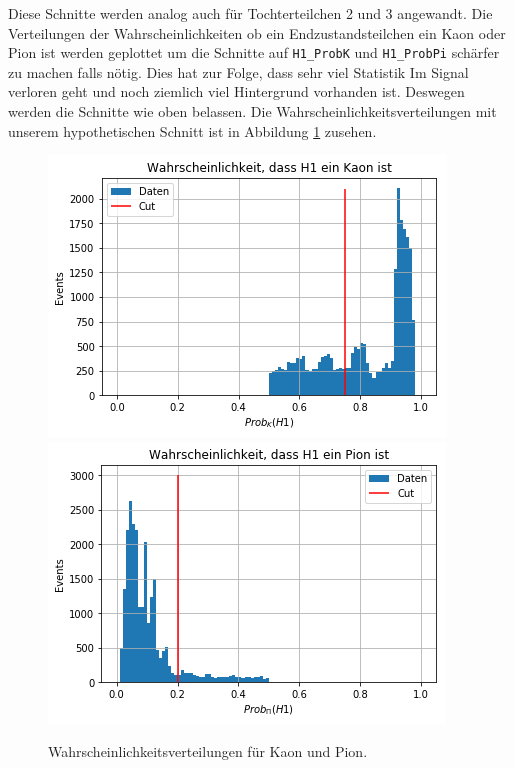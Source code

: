 Diese Schnitte werden analog auch f\"ur Tochterteilchen 2 und 3 angewandt.
Die Verteilungen der Wahrscheinlichkeiten ob ein Endzustandsteilchen ein Kaon oder Pion ist werden geplottet um die Schnitte auf \texttt{H1\_ProbK} und \texttt{H1\_ProbPi} sch\"arfer zu machen falls nötig.
Dies hat zur Folge, dass sehr viel Statistik Im Signal verloren geht und noch ziemlich viel Hintergrund vorhanden ist. Deswegen werden die Schnitte wie oben belassen.
Die Wahrscheinlichkeitsverteilungen mit unserem hypothetischen Schnitt ist in Abbildung \ref{fig:probCuts} zusehen.

\begin{figure}[!htb]
  \centering
    \includegraphics[width=\linewidth]{plots/probability_kaon1.png}
    \label{fig:probK}
  \endminipage\hfill
    \includegraphics[width=\linewidth]{plots/probability_pion1.png}
    \label{fig:probPi}
  \endminipage
  \caption{Wahrscheinlichkeitsverteilungen f\"ur Kaon und Pion.}
  \label{fig:probCuts}
\end{figure}

